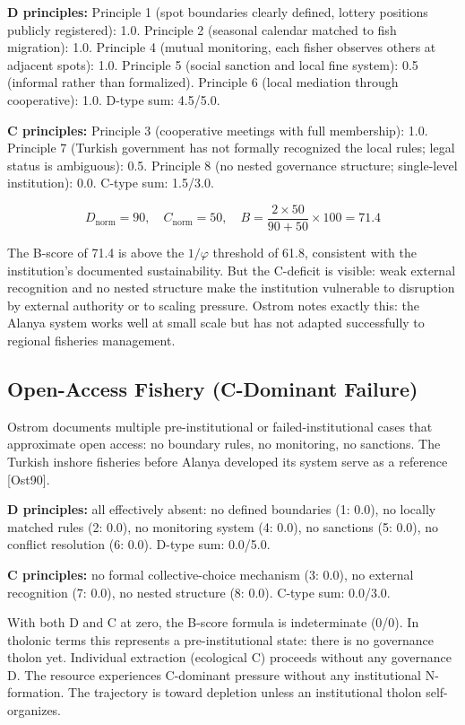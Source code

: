 \documentclass[12pt]{article}
\begin{document}
\textbf{D principles:} Principle 1 (spot boundaries clearly defined,
lottery positions publicly registered): 1.0. Principle 2 (seasonal
calendar matched to fish migration): 1.0. Principle 4 (mutual
monitoring, each fisher observes others at adjacent spots): 1.0.
Principle 5 (social sanction and local fine system): 0.5 (informal
rather than formalized). Principle 6 (local mediation through
cooperative): 1.0. D-type sum: 4.5/5.0.

\textbf{C principles:} Principle 3 (cooperative meetings with full
membership): 1.0. Principle 7 (Turkish government has not formally
recognized the local rules; legal status is ambiguous): 0.5. Principle 8
(no nested governance structure; single-level institution): 0.0. C-type
sum: 1.5/3.0.

\[D_{\text{norm}} = 90, \quad C_{\text{norm}} = 50, \quad B = \frac{2 \times 50}{90 + 50} \times 100 = 71.4\]

The B-score of 71.4 is above the \(1/\varphi\) threshold of 61.8,
consistent with the institution's documented sustainability. But the
C-deficit is visible: weak external recognition and no nested structure
make the institution vulnerable to disruption by external authority or
to scaling pressure. Ostrom notes exactly this: the Alanya system works
well at small scale but has not adapted successfully to regional
fisheries management.

\subsection{Open-Access Fishery (C-Dominant Failure)}\label{open-access-fishery-c-dominant-failure}

Ostrom documents multiple pre-institutional or failed-institutional
cases that approximate open access: no boundary rules, no monitoring, no
sanctions. The Turkish inshore fisheries before Alanya developed its
system serve as a reference {[}Ost90{]}.

\textbf{D principles:} all effectively absent: no defined boundaries (1:
0.0), no locally matched rules (2: 0.0), no monitoring system (4: 0.0),
no sanctions (5: 0.0), no conflict resolution (6: 0.0). D-type sum:
0.0/5.0.

\textbf{C principles:} no formal collective-choice mechanism (3: 0.0),
no external recognition (7: 0.0), no nested structure (8: 0.0). C-type
sum: 0.0/3.0.

With both D and C at zero, the B-score formula is indeterminate (0/0).
In tholonic terms this represents a pre-institutional state: there is no
governance tholon yet. Individual extraction (ecological C) proceeds
without any governance D. The resource experiences C-dominant pressure
without any institutional N-formation. The trajectory is toward
depletion unless an institutional tholon self-organizes.
\end{document}
